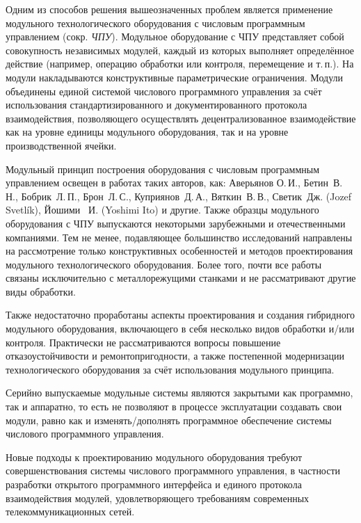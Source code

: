 Одним из способов решения вышеозначенных проблем является применение модульного технологического оборудования с числовым программным управлением (сокр. \textit{ЧПУ}). Модульное оборудование с ЧПУ представляет собой совокупность независимых модулей, каждый из которых выполняет определённое действие (например, операцию обработки или контроля, перемещение и т.\,п.). На модули накладываются конструктивные параметрические ограничения. Модули объединены единой системой числового программного управления за счёт использования стандартизированного и документированного протокола взаимодействия, позволяющего осуществлять децентрализованное взаимодействие как на уровне единицы модульного оборудования, так и на уровне производственной ячейки. 

Модульный принцип построения оборудования с числовым программным управлением освещен в работах таких авторов, как: Аверьянов О.\,И., Бетин~В.\,Н., Бобрик~Л.\,П., Брон~Л.\,С., Куприянов~Д.\,А., Вяткин~В.\,В., Светик~Дж. (Jozef Svetl\'ik), Йошими ~И. (Yoshimi Ito) и другие. Также образцы модульного оборудования с ЧПУ выпускаются некоторыми зарубежными и отечественными компаниями. Тем не менее, подавляющее большинство исследований направлены на рассмотрение только конструктивных особенностей и методов проектирования модульного технологического оборудования. Более того, почти все работы связаны исключительно с металлорежущими станками и не рассматривают другие виды обработки.

Также недостаточно проработаны аспекты проектирования и создания гибридного модульного оборудования, включающего в себя несколько видов обработки и/или контроля. Практически не рассматриваются вопросы повышение отказоустойчивости и ремонтопригодности, а также постепенной модернизации технологического оборудования за счёт использования модульного принципа.

Серийно выпускаемые модульные системы являются закрытыми как программно, так и аппаратно, то есть не позволяют в процессе эксплуатации создавать свои модули, равно как и изменять/дополнять программное обеспечение системы числового программного управления. 

Новые подходы к проектированию модульного оборудования требуют совершенствования системы числового программного управления, в частности разработки открытого программного интерфейса и единого протокола взаимодействия модулей, удовлетворяющего требованиям современных телекоммуникационных сетей.

